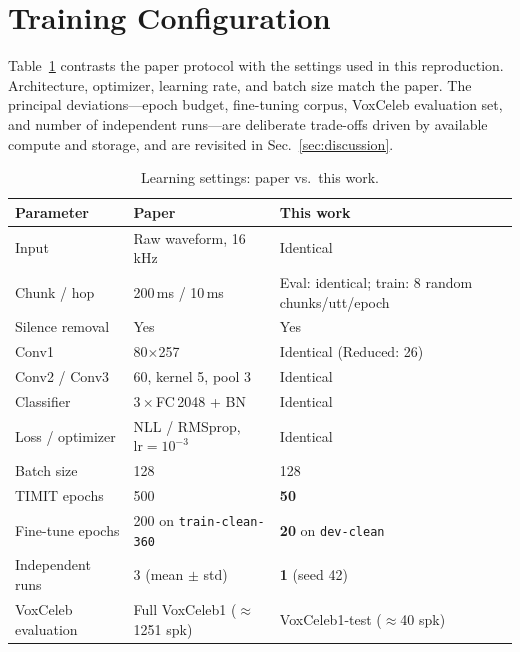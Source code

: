 \documentclass[11pt,a4paper]{article}
\begin{document}
\section{Training Configuration}

Table~\ref{tab:hparams} contrasts the paper protocol with the settings used in this reproduction. Architecture, optimizer, learning rate, and batch size match the paper. The principal deviations---epoch budget, fine-tuning corpus, VoxCeleb evaluation set, and number of independent runs---are deliberate trade-offs driven by available compute and storage, and are revisited in Sec.~\ref{sec:discussion}.

\begin{table}[H]
\centering
\caption{Learning settings: paper vs.\ this work.}
\label{tab:hparams}
\begin{tabular}{@{}lll@{}}
\toprule
\textbf{Parameter} & \textbf{Paper} & \textbf{This work} \\
\midrule
Input                 & Raw waveform, 16\,kHz          & Identical \\
Chunk / hop           & 200\,ms / 10\,ms               & Eval: identical; train: 8 random chunks/utt/epoch \\
Silence removal       & Yes                            & Yes \\
Conv1                 & 80$\times$257                  & Identical (Reduced: 26) \\
Conv2 / Conv3         & 60, kernel 5, pool 3           & Identical \\
Classifier            & $3\times$FC\,2048 + BN         & Identical \\
Loss / optimizer      & NLL / RMSprop, $\mathrm{lr}{=}10^{-3}$ & Identical \\
Batch size            & 128                            & 128 \\
TIMIT epochs          & 500                            & \textbf{50} \\
Fine-tune epochs      & 200 on \texttt{train-clean-360}& \textbf{20} on \texttt{dev-clean} \\
Independent runs      & 3 (mean $\pm$ std)             & \textbf{1} (seed 42) \\
VoxCeleb evaluation   & Full VoxCeleb1 ($\approx$1251 spk) & VoxCeleb1-test ($\approx$40 spk) \\
\bottomrule
\end{tabular}
\end{table}
\end{document}
